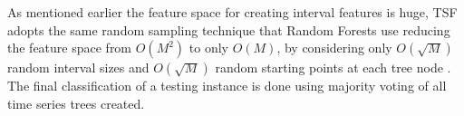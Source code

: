 As mentioned earlier the feature space for creating interval features is huge, TSF adopts the same random sampling technique that Random Forests use
reducing the feature space from $O(M^{2})$ to only $O(M)$, by considering only $O(\sqrt{M})$ random interval sizes and $O(\sqrt{M})$
random starting points at each tree node \cite{deng2013time}. The final classification of a testing instance is done using majority
voting of all time series trees created.
